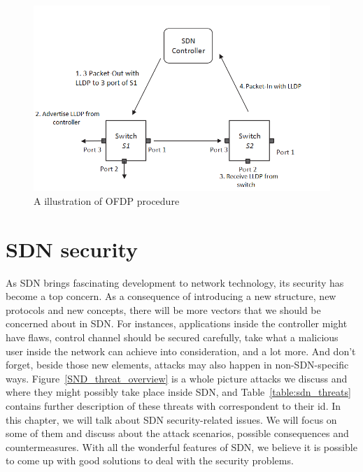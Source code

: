 \begin{figure}[H]
\begin{center} 
\includegraphics[width=1\textwidth]{figures/OFDP_procedure.png}
\end{center}
\caption{A illustration of OFDP procedure}
\label{OFDP}
\end{figure}

\section{SDN security}
As SDN brings fascinating development to network technology, its security has become a top concern. As a consequence of introducing a new structure, new protocols and new concepts, there will be more vectors that we should be concerned about in SDN. For instances, applications inside the controller might have flaws, control channel should be secured carefully, take what a malicious user inside the network can achieve into consideration, and a lot more. And don't forget, beside those new elements, attacks may also happen in non-SDN-specific ways. Figure~\ref{SND_threat_overview} is a whole picture attacks we discuss and where they might possibly take place inside SDN, and Table~\ref{table:sdn_threats} contains further description of these threats with correspondent to their id. In this chapter, we will talk about SDN security-related issues. We will focus on some of them and discuss about the attack scenarios, possible consequences and countermeasures. With all the wonderful features of SDN, we believe it is possible to come up with good solutions to deal with the security problems.


